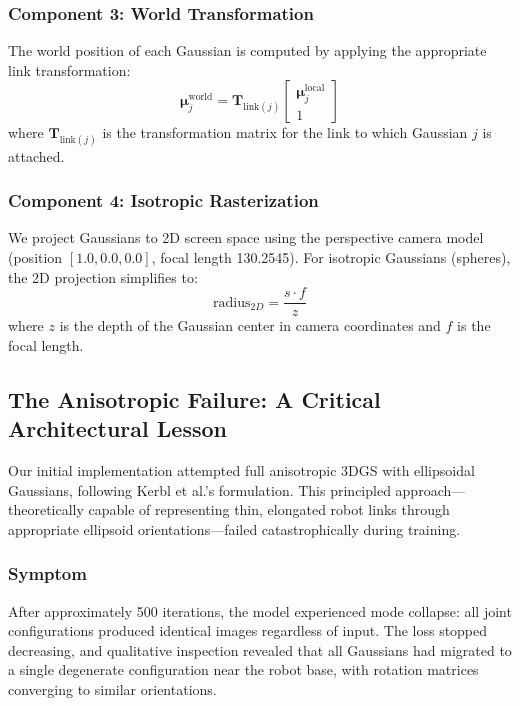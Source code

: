 \documentclass[12pt,a4paper,oneside]{report}
\begin{document}
\subsubsection{Component 3: World Transformation}

The world position of each Gaussian is computed by applying the appropriate link transformation:
\begin{equation}
\boldsymbol{\mu}_j^{\text{world}} = \mathbf{T}_{\text{link}(j)} \begin{bmatrix} \boldsymbol{\mu}_j^{\text{local}} \\ 1 \end{bmatrix}
\end{equation}
where $\mathbf{T}_{\text{link}(j)}$ is the transformation matrix for the link to which Gaussian $j$ is attached.

\subsubsection{Component 4: Isotropic Rasterization}

We project Gaussians to 2D screen space using the perspective camera model (position $[1.0, 0.0, 0.0]$, focal length 130.2545). For isotropic Gaussians (spheres), the 2D projection simplifies to:
\begin{equation}
\text{radius}_{2D} = \frac{s \cdot f}{z}
\end{equation}
where $z$ is the depth of the Gaussian center in camera coordinates and $f$ is the focal length.

\subsection{The Anisotropic Failure: A Critical Architectural Lesson}

Our initial implementation attempted full anisotropic 3DGS with ellipsoidal Gaussians, following Kerbl et al.'s formulation. This principled approach---theoretically capable of representing thin, elongated robot links through appropriate ellipsoid orientations---failed catastrophically during training.

\subsubsection{Symptom}

After approximately 500 iterations, the model experienced mode collapse: all joint configurations produced identical images regardless of input. The loss stopped decreasing, and qualitative inspection revealed that all Gaussians had migrated to a single degenerate configuration near the robot base, with rotation matrices converging to similar orientations.
\end{document}
